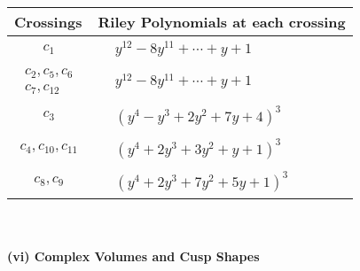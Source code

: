 \documentclass[1p]{elsarticle_modified}
\theoremstyle{definition}
\begin{document}
\begin{tabular}{m{50pt}|m{274pt}}
Crossings & \hspace{64pt}Riley Polynomials at each crossing \\
\hline $$\begin{aligned}c_{1}\end{aligned}$$&$\begin{aligned}
&y^{12}-8 y^{11}+\cdots+y+1
\end{aligned}$\\
\hline $$\begin{aligned}c_{2},c_{5},c_{6}\\c_{7},c_{12}\end{aligned}$$&$\begin{aligned}
&y^{12}-8 y^{11}+\cdots+y+1
\end{aligned}$\\
\hline $$\begin{aligned}c_{3}\end{aligned}$$&$\begin{aligned}
&(y^4- y^3+2 y^2+7 y+4)^3
\end{aligned}$\\
\hline $$\begin{aligned}c_{4},c_{10},c_{11}\end{aligned}$$&$\begin{aligned}
&(y^4+2 y^3+3 y^2+y+1)^3
\end{aligned}$\\
\hline $$\begin{aligned}c_{8},c_{9}\end{aligned}$$&$\begin{aligned}
&(y^4+2 y^3+7 y^2+5 y+1)^3
\end{aligned}$\\
\hline
\end{tabular}\\~\\
\newpage\flushleft \textbf{(vi) Complex Volumes and Cusp Shapes}
\end{document}
